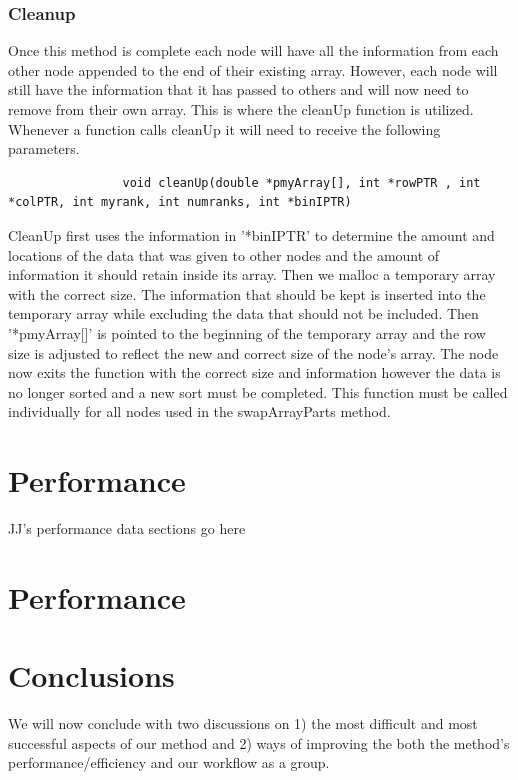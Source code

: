 \documentclass{article}
\begin{document}
\subsubsection{Cleanup}
Once this method is complete each node will have all the information from each other node appended to the end of their existing array. However, each node will still have the information that it has passed to others and will now need to remove from their own array. This is where the cleanUp function is utilized. Whenever a function calls cleanUp it will need to receive the following parameters.
\begin{lstlisting}
                void cleanUp(double *pmyArray[], int *rowPTR , int *colPTR, int myrank, int numranks, int *binIPTR)
\end{lstlisting}
CleanUp first uses the information in '*binIPTR' to determine the amount and locations of the data that was given to other nodes and the amount of information it should retain inside its array. Then we malloc a temporary array with the correct size. The information that should be kept is inserted into the temporary array while excluding the data that should not be included. Then '*pmyArray[]' is pointed to the beginning of the temporary array and the row size is adjusted to reflect the new and correct size of the node's array. The node now exits the function with the correct size and information however the data is no longer sorted and a new sort must be completed. This function must be called individually for all nodes used in the swapArrayParts method. 


\section{Performance}

JJ's performance data sections go here

\section{Performance}



\section{Conclusions}
We will now conclude with two discussions on 1) the most difficult and most successful aspects of our method and 2) ways of improving the both the method's performance/efficiency and our workflow as a group.
\end{document}
